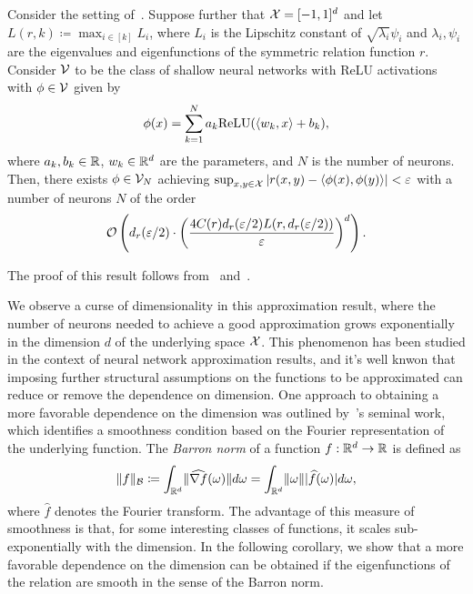 \begin{corollary}\label{cor:sym_iprod_kernel_neuron_bound}
	Consider the setting of~. Suppose further that ${\mathcal{X}} = [-1, 1]^d$ and let $L(r, k) \coloneq \max_{i \in [k]} L_i$, where $L_i$ is the Lipschitz constant of $\sqrt{\lambda_i} \psi_i$ and $\lambda_i, \psi_i$ are the eigenvalues and eigenfunctions of the symmetric relation function $r$. Consider ${\mathcal{V}}$ to be the class of shallow neural networks with ReLU activations with $\phi \in {\mathcal{V}}$ given by
	\begin{equation*}
		\phi(x) = \sum_{k=1}^{N} a_k \mathrm{ReLU}(\iprod{w_k}{x} + b_k),
	\end{equation*}
	where $a_k, b_k \in \mathbb{R}$, $w_k \in \mathbb{R}^{d}$ are the parameters, and $N$ is the number of neurons. Then, there exists $\phi \in {\mathcal{V}}_N$ achieving $\sup_{x,y \in \mathcal{X}}{\left\lvert r(x,y) - \left \langle \phi(x), \phi(y) \right\rangle\right\rvert} < \varepsilon$ with a number of neurons $N$ of the order
	\[{\mathcal{O}}\left(d_r(\varepsilon / 2) \cdot \left(\frac{4 C(r) d_r(\varepsilon / 2) L(r, d_r(\varepsilon/2))}{\varepsilon}\right)^{d}\right).\]
\end{corollary}
The proof of this result follows from~ and~\textcite{bachBreakingCurseDimensionality2016}.

We observe a curse of dimensionality in this approximation result, where the number of neurons needed to achieve a good approximation grows exponentially in the dimension $d$ of the underlying space ${\mathcal{X}}$. This phenomenon has been studied in the context of neural network approximation results, and it's well knwon that imposing further structural assumptions on the functions to be approximated can reduce or remove the dependence on dimension. One approach to obtaining a more favorable dependence on the dimension was outlined by~\textcite{barronUniversalApproximation1993}'s seminal work, which identifies a smoothness condition based on the Fourier representation of the underlying function.  The \textit{Barron norm} of a function $f: \mathbb{R}^d \to \mathbb{R}$ is defined as
\[\lVert f\rVert_{{\mathcal{B}}} \coloneq \int_{\mathbb{R}^d} \lVert\widehat{\nabla f}(\omega)\rVert d\omega = \int_{\mathbb{R}^d} \lVert\omega\rVert \lvert\widehat{f}(\omega)\rvert d \omega,\]
where $\hat{f}$ denotes the Fourier transform. The advantage of this measure of smoothness is that, for some interesting classes of functions, it scales sub-exponentially with the dimension. In the following corollary, we show that a more favorable dependence on the dimension can be obtained if the eigenfunctions of the relation are smooth in the sense of the Barron norm.

